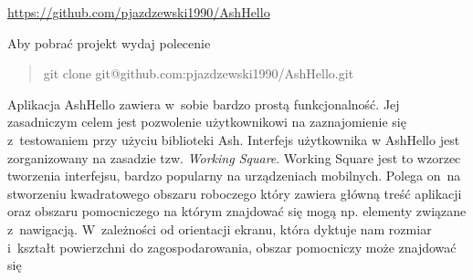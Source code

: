 \documentclass[brudnopis]{xmgr}
\begin{document}
\url{https://github.com/pjazdzewski1990/AshHello}

Aby pobrać projekt wydaj polecenie

\begin{quote}
   git clone git@github.com:pjazdzewski1990/AshHello.git
\end{quote}

Aplikacja AshHello zawiera w~sobie bardzo prostą funkcjonalność. Jej zasadniczym celem jest pozwolenie użytkownikowi na zaznajomienie się z~testowaniem przy użyciu biblioteki Ash. Interfejs użytkownika w AshHello jest zorganizowany na zasadzie tzw. {\it Working Square}. Working Square jest to wzorzec tworzenia interfejsu, bardzo popularny na urządzeniach mobilnych. Polega on~na stworzeniu kwadratowego obszaru roboczego który zawiera główną treść aplikacji oraz obszaru pomocniczego na którym znajdować się mogą np. elementy związane z~nawigacją. W~zależności od orientacji ekranu, która dyktuje nam rozmiar i~kształt powierzchni do zagospodarowania, obszar pomocniczy może znajdować się 
\end{document}
